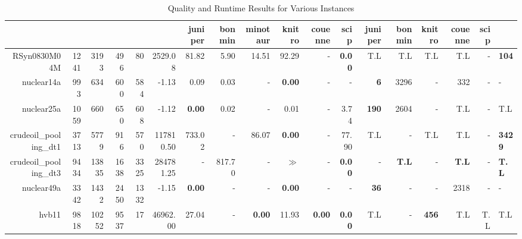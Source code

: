 \begin{table*}[t] 
\footnotesize 
\caption{Quality and Runtime Results for Various Instances} 
\begin{tabular}{|r|r|r|r|r||r||r|r|r|r|r||r|r|r|r|r|r|} 
\hline 
  & juniper    & bonmin  & minotaur & knitro & couenne        & scip            & juniper          & bonmin  & knitro  & couenne         & scip \\  
    \hline 
    \hline 
                      RSyn0830M04M &         1241 &          3193 &          496 &            80 &             2529.08 &          81.82 &           5.90 &          14.51 &          92.29 &              - &  \textbf{0.00} &                T.L &                T.L &                T.L &                T.L &            - & \textbf{104} \\ 
                        nuclear14a &          993 &           634 &          600 &           584 &               -1.13 &           0.09 &           0.03 &              - &  \textbf{0.00} &              - &              - &         \textbf{6} &               3296 &                  - &                332 &            - &            - \\ 
                        nuclear25a &         1059 &           660 &          650 &           608 &               -1.12 &  \textbf{0.00} &           0.02 &              - &           0.01 &              - &           3.74 &       \textbf{190} &               2604 &                  - &                T.L &            - &          T.L \\ 
            crudeoil\_pooling\_dt1 &         3713 &          5779 &          916 &           570 &           117810.50 &         733.02 &              - &          86.07 &  \textbf{0.00} &              - &          77.90 &                T.L &                  - &                T.L &                T.L &            - &\textbf{3429} \\ 
            crudeoil\_pooling\_dt3 &         9434 &         13835 &         1638 &          3325 &           284781.25 &              - &         817.70 &              - &          $\gg$ &              - &  \textbf{0.00} &                  - &       \textbf{T.L} &                  - &       \textbf{T.L} &            - & \textbf{T.L} \\ 
                        nuclear49a &         3342 &          1432 &         2450 &          1332 &               -1.15 &  \textbf{0.00} &              - &              - &  \textbf{0.00} &              - &              - &        \textbf{36} &                  - &                  - &               2318 &            - &            - \\ 
                             hvb11 &         9818 &         10252 &         9537 &            17 &            46962.00 &          27.04 &              - &  \textbf{0.00} &          11.93 &  \textbf{0.00} &  \textbf{0.00} &                T.L &                  - &       \textbf{456} &                T.L &          T.L &          T.L \\ 
\hline 
\end{tabular}\\ 
\label{table:results} 
\end{table*} 
